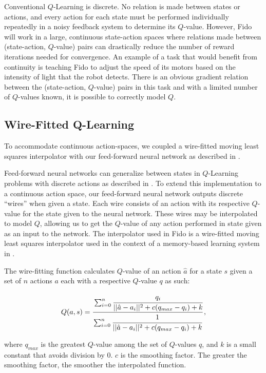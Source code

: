 Conventional $Q$-Learning is discrete. No relation is made between states or actions, and every action for each state must be performed individually repeatedly in a noisy feedback system to determine its $Q$-value. However, Fido will work in a large, continuous state-action spaces where relations made between (state-action, $Q$-value) pairs can drastically reduce the number of reward iterations needed for convergence. An example of a task that would benefit from continuity is teaching Fido to adjust the speed of its motors based on the intensity of light that the robot detects. There is an obvious gradient relation between the (state-action, $Q$-value) pairs in this task and with a limited number of $Q$-values known, it is possible to correctly model $Q$.

\subsection{Wire-Fitted Q-Learning}

To accommodate continuous action-spaces, we coupled a wire-fitted moving least squares interpolator with our feed-forward neural network as described in \cite{gaskett}. 

Feed-forward neural networks can generalize between states in $Q$-Learning problems with discrete actions as described in \cite{rummery}. To extend this implementation to a continuous action space, our feed-forward neural network outputs discrete ``wires'' when given a state. Each wire consists of an action with its respective $Q$-value for the state given to the neural network. These wires may be interpolated to model $Q$, allowing us to get the $Q$-value of any action performed in state given as an input to the network. The interpolator used in Fido is a wire-fitted moving least squares interpolator used in the context of a memory-based learning system in \cite{baird}.

The wire-fitting function calculates $Q$-value of an action $\hat{a}$ for a state $s$ given a set of $n$ actions $a$ each with a respective $Q$-value $q$ as such:

\begin{equation}
	Q(a, s) = \cfrac{\sum_{i=0}^{n}\cfrac{q_i}{||\hat{a}-a_i||^2+c(q_{max}-q_i)+k}}{\sum_{i=0}^{n}\cfrac{1}{||\hat{a}-a_i||^2+c(q_{max}-q_i)+k}}
	\,,
\end{equation}

where $q_{max}$ is the greatest $Q$-value among the set of $Q$-values $q$, and $k$ is a small constant that avoids division by 0. $c$ is the smoothing factor. The greater the smoothing factor, the smoother the interpolated function.


